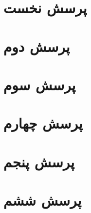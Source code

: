 \section*{پرسش نخست}



\section*{پرسش دوم}









\section*{پرسش سوم}


\section*{پرسش چهارم}

\section*{پرسش پنجم}



\section*{پرسش ششم}


